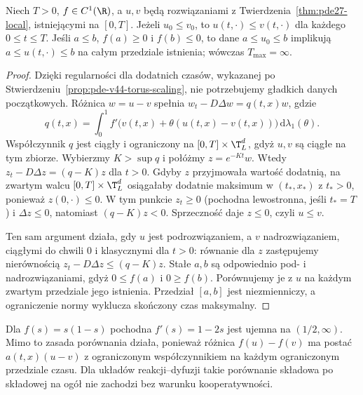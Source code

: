 \begin{twierdzenie}
\label{thm:pde27-comparison}
Niech $T>0$, $f\in C^1(\R)$, a $u,v$ będą
rozwiązaniami z Twierdzenia~\ref{thm:pde27-local},
istniejącymi na $[0,T]$.
Jeżeli $u_0\le v_0$, to $u(t,\cdot)\le v(t,\cdot)$
dla każdego $0\le t\le T$. Jeśli $a\le b$,
$f(a)\ge0$ i $f(b)\le0$, to dane $a\le u_0\le b$
implikują $a\le u(t,\cdot)\le b$ na całym
przedziale istnienia; wówczas $T_{\max}=\infty$.
\end{twierdzenie}
\begin{proof}
Dzięki regularności dla dodatnich czasów, wykazanej
po Stwierdzeniu~\ref{prop:pde-v44-torus-scaling},
nie potrzebujemy gładkich danych początkowych.
Różnica $w=u-v$ spełnia
$w_t-D\Delta w=q(t,x)w$, gdzie
\[
 q(t,x)=\int_0^1 f'\bigl(v(t,x)+\theta(u(t,x)-v(t,x))\bigr)
 \,\mathrm d\lambda_1(\theta).
\]
Współczynnik $q$ jest ciągły i ograniczony na
$[0,T]\times\T_L^d$, gdyż $u,v$ są ciągłe na tym zbiorze.
Wybierzmy $K>\sup q$ i połóżmy $z=e^{-Kt}w$.
Wtedy $z_t-D\Delta z=(q-K)z$ dla $t>0$.
Gdyby $z$ przyjmowała wartość dodatnią, na zwartym
walcu $[0,T]\times\T_L^d$ osiągałaby dodatnie maksimum
w $(t_*,x_*)$ z $t_*>0$, ponieważ $z(0,\cdot)\le0$.
W tym punkcie $z_t\ge0$ (pochodna lewostronna,
jeśli $t_*=T$) i $\Delta z\le0$, natomiast
$(q-K)z<0$. Sprzeczność daje $z\le0$, czyli $u\le v$.

Ten sam argument działa, gdy $u$ jest podrozwiązaniem,
a $v$ nadrozwiązaniem, ciągłymi do chwili $0$
i klasycznymi dla $t>0$: równanie dla $z$
zastępujemy nierównością $z_t-D\Delta z\le(q-K)z$.
Stałe $a,b$ są odpowiednio pod- i nadrozwiązaniami,
gdyż $0\le f(a)$ i $0\ge f(b)$. Porównujemy je z $u$
na każdym zwartym przedziale jego istnienia.
Przedział $[a,b]$ jest niezmienniczy, a ograniczenie normy
wyklucza skończony czas maksymalny.
\end{proof}

\begin{kontrprzyklad}
Dla $f(s)=s(1-s)$ pochodna $f'(s)=1-2s$
jest ujemna na $(1/2,\infty)$.
Mimo to zasada porównania działa, ponieważ różnica
$f(u)-f(v)$ ma postać $a(t,x)(u-v)$ z ograniczonym
współczynnikiem na każdym ograniczonym przedziale czasu.
Dla układów reakcji--dyfuzji takie porównanie
składowa po składowej na ogół nie zachodzi bez
warunku kooperatywności.
\end{kontrprzyklad}

